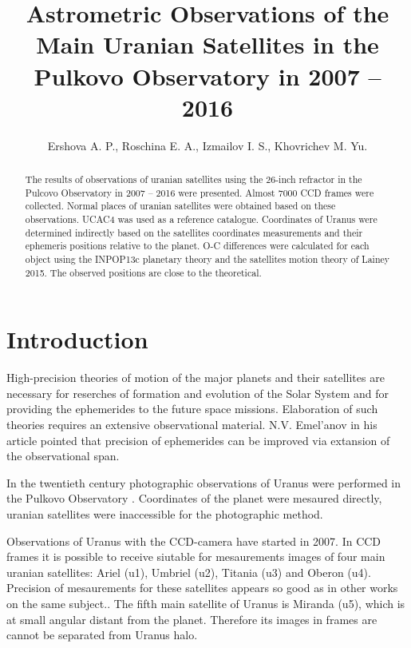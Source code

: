 \documentclass[]{article}
\title{Astrometric Observations of the Main Uranian Satellites in the Pulkovo Observatory in 2007 -- 2016}
\author{Ershova A. P., Roschina E. A., Izmailov I. S., Khovrichev M. Yu.}
\begin{document}
\maketitle

\begin{abstract}
The results of observations of uranian satellites using the 26-inch refractor in the Pulcovo Observatory in 2007 -- 2016 were presented. Almost 7000 CCD frames were collected. Normal places of uranian satellites were obtained based on these observations. UCAC4 was used as a reference catalogue. Coordinates of Uranus were determined indirectly based on the satellites coordinates measurements and their ephemeris positions relative to the planet. O-C differences were calculated for each object using the INPOP13c planetary theory and the satellites motion theory of Lainey 2015. The observed positions are close to the theoretical.
\end{abstract}

\section{Introduction}
High-precision theories of motion of the major planets and their satellites  are necessary for reserches of formation and evolution of the Solar System and for providing the ephemerides to the future space missions. Elaboration of such theories requires an extensive observational material. N.V. Emel'anov in his article \cite{4} pointed that precision of ephemerides can be improved via extansion of the observational span.\par

In the twentieth century photographic observations of Uranus were performed in the Pulkovo Observatory \cite{8}. Coordinates of the planet were mesaured directly, uranian satellites were inaccessible for the photographic method.\par

Observations of Uranus with the CCD-camera have started in 2007. In CCD frames it is possible to receive siutable for mesaurements images of four main uranian satellites: Ariel (u1), Umbriel (u2), Titania (u3) and Oberon (u4). Precision of mesaurements for these satellites appears so good as in other works on the same subject.\cite{2, 7}. The fifth main satellite of Uranus is Miranda (u5), which is at small angular distant from the planet. Therefore its images in frames are cannot be separated from Uranus halo.\par
\end{document}
